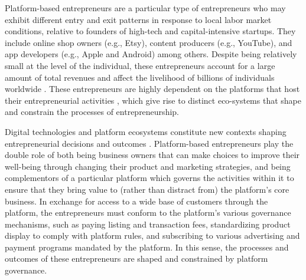 \documentclass[letterpaper,12pt]{article}
\begin{document}
Platform-based entrepreneurs are a particular type of entrepreneurs who may exhibit different entry and exit patterns in response to local labor market conditions, relative to founders of high-tech and capital-intensive startups. They include online shop owners (e.g., Etsy), content producers (e.g., YouTube), and app developers (e.g., Apple and Android) among others. Despite being relatively small at the level of the individual, these entrepreneurs account for a large amount of total revenues and affect the livelihood of billions of individuals worldwide \citep{aldrich_unicorns_2018,bonina2021digital}. These entrepreneurs are highly dependent on the platforms that host their entrepreneurial activities \citep{cutolo_platform-dependent_2021}, which give rise to distinct eco-systems that shape and constrain the processes of entrepreneurship. 


Digital technologies and platform ecosystems constitute new contexts shaping entrepreneurial decisions and outcomes \citep{nambisan_digital_2017,eckhardt_open_2018,nambisan_costs_2021}. Platform-based entrepreneurs play the double role of both being business owners that can make choices to improve their well-being through changing their product and marketing strategies, and being complementors of a particular platform which governs the activities within it to ensure that they bring value to (rather than distract from) the platform's core business. In exchange for access to a wide base of customers through the platform, the entrepreneurs must conform to the platform's various governance mechanisms, such as paying listing and transaction fees, standardizing product display to comply with platform rules, and subscribing to various advertising and payment programs mandated by the platform. In this sense, the processes and outcomes of these entrepreneurs are shaped and constrained by platform governance.
\end{document}
